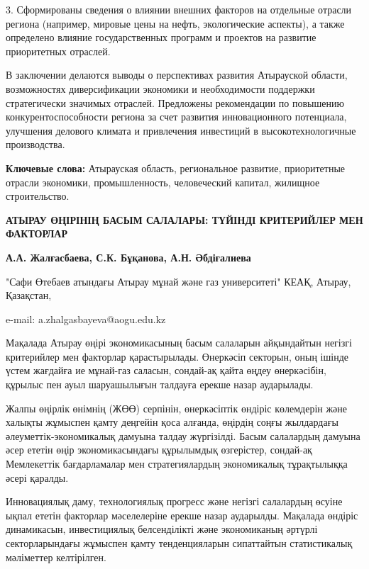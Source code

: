 3. Сформированы сведения о влиянии внешних факторов на отдельные отрасли
региона (например, мировые цены на нефть, экологические аспекты), а
также определено влияние государственных программ и проектов на развитие
приоритетных отраслей.

В заключении делаются выводы о перспективах развития Атырауской области,
возможностях диверсификации экономики и необходимости поддержки
стратегически значимых отраслей. Предложены рекомендации по повышению
конкурентоспособности региона за счет развития инновационного
потенциала, улучшения делового климата и привлечения инвестиций в
высокотехнологичные производства.

{\bfseries Ключевые слова:} Атырауская область, региональное развитие,
приоритетные отрасли экономики, промышленность, человеческий капитал,
жилищное строительство.

\begin{articleheader}
{\bfseries АТЫРАУ ӨҢІРІНІҢ БАСЫМ САЛАЛАРЫ: ТҮЙІНДІ КРИТЕРИЙЛЕР МЕН ФАКТОРЛАР}

{\bfseries
А.А. Жалғасбаева\textsuperscript{\envelope },
С.К. Бұқанова,
А.Н. Әбдіғалиева
}
\end{articleheader}

\begin{affiliation}
"Сафи Өтебаев атындағы Атырау мұнай және газ университеті" КЕАҚ, Атырау, Қазақстан,

e-mail: a.zhalgasbayeva@aogu.edu.kz
\end{affiliation}

Мақалада Атырау өңірі экономикасының басым салаларын айқындайтын негізгі
критерийлер мен факторлар қарастырылады. Өнеркәсіп секторын, оның ішінде
үстем жағдайға ие мұнай-газ саласын, сондай-ақ қайта өңдеу өнеркәсібін,
құрылыс пен ауыл шаруашылығын талдауға ерекше назар аударылады.

Жалпы өңірлік өнімнің (ЖӨӨ) серпінін, өнеркәсіптік өндіріс көлемдерін
және халықты жұмыспен қамту деңгейін қоса алғанда, өңірдің соңғы
жылдардағы әлеуметтік-экономикалық дамуына талдау жүргізілді. Басым
салалардың дамуына әсер ететін өңір экономикасындағы құрылымдық
өзгерістер, сондай-ақ Мемлекеттік бағдарламалар мен стратегиялардың
экономикалық тұрақтылыққа әсері қаралды.

Инновациялық даму, технологиялық прогресс және негізгі салалардың өсуіне
ықпал ететін факторлар мәселелеріне ерекше назар аударылды. Мақалада
өндіріс динамикасын, инвестициялық белсенділікті және экономиканың
әртүрлі секторларындағы жұмыспен қамту тенденцияларын сипаттайтын
статистикалық мәліметтер келтірілген.

